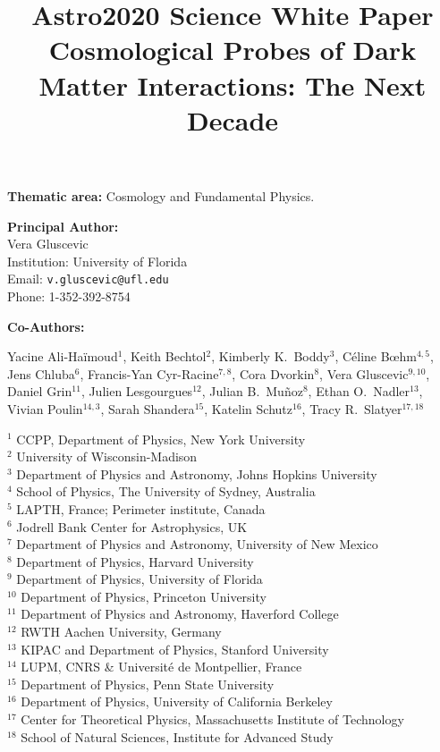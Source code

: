 \documentclass[12pt]{article}
\title{{Astro2020 Science White Paper}\\
\vspace{0.5cm}
\bf{Cosmological Probes of Dark Matter Interactions: The Next Decade}}
\date{}
\author{}
\begin{document}
\maketitle
\vspace{-2cm}
\begin{center}
\textbf{Thematic area:} Cosmology and Fundamental Physics.     
\end{center}

\noindent\textbf{Principal Author:} \\
Vera Gluscevic\\
Institution: University of Florida\\
Email: \texttt{v.gluscevic@ufl.edu}\\
Phone: 1-352-392-8754

\vspace{0.5cm}
\noindent\textbf{Co-Authors:}

\noindent 
{Yacine Ali-Ha\"imoud$^{1}$, Keith Bechtol$^{2}$, Kimberly K.~Boddy$^{3}$, C\'eline B\oe{}hm$^{4,5}$, Jens Chluba$^{6}$, Francis-Yan Cyr-Racine$^{7,8}$, Cora Dvorkin$^{8}$, Vera Gluscevic$^{9,10}$, Daniel Grin$^{11}$, Julien Lesgourgues$^{12}$, Julian B.~Mu\~noz$^{8}$, Ethan O.~Nadler$^{13}$, Vivian Poulin$^{14,3}$, Sarah Shandera$^{15}$, Katelin Schutz$^{16}$, Tracy R.~Slatyer$^{17,18}$}

\def\affil#1{\noindent #1 \\}

\begin{multicols}{2}
\scriptsize
\affil{$^{1}$ CCPP, Department of Physics, New York University}
\affil{$^{2}$ University of Wisconsin-Madison}
\affil{$^{3}$ Department of Physics and Astronomy, Johns Hopkins University}
\affil{$^{4}$ School of Physics, The University of Sydney, Australia}
\affil{$^{5}$ LAPTH, France; Perimeter institute, Canada}
\affil{$^{6}$ Jodrell Bank Center for Astrophysics, UK}
\affil{$^{7}$ Department of Physics and Astronomy, University of New Mexico}
\affil{$^{8}$ Department of Physics, Harvard University}
\affil{$^{9}$ Department of Physics, University of Florida}
\affil{$^{10}$ Department of Physics, Princeton University}
\affil{$^{11}$ Department of Physics and Astronomy, Haverford College}
\affil{$^{12}$ RWTH Aachen University, Germany}
\affil{$^{13}$ KIPAC and Department of Physics, Stanford University}
\affil{$^{14}$ LUPM, CNRS \& Universit\'e de Montpellier, France}
\affil{$^{15}$ Department of Physics, Penn State University}
\affil{$^{16}$ Department of Physics, University of California Berkeley}
\affil{$^{17}$ Center for Theoretical Physics, Massachusetts Institute of Technology}
\affil{$^{18}$ School of Natural Sciences, Institute for Advanced Study}


\normalsize
\end{multicols}
\end{document}
